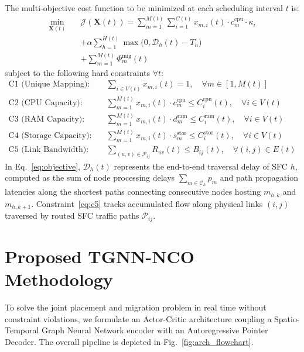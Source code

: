 \documentclass[conference]{IEEEtran}
\begin{document}
The multi-objective cost function to be minimized at each scheduling interval $t$ is:
\begin{align}
\min_{\mathbf{X}(t)} \quad & \mathcal{J}(\mathbf{X}(t)) = \sum_{m=1}^{M(t)} \sum_{i=1}^{C(t)} x_{m, i}(t) \cdot c_m^{\text{cpu}} \cdot \kappa_i \nonumber \\
& + \alpha \sum_{h=1}^{H(t)} \max\big(0, \mathcal{D}_h(t) - T_h\big) \nonumber \\
& + \sum_{m=1}^{M(t)} \Phi_m^{\text{mig}}(t)
\label{eq:objective}
\end{align}
subject to the following hard constraints $\forall t$:
\begin{align}
\text{C1 (Unique Mapping):} \quad & \sum_{i \in V(t)} x_{m, i}(t) = 1, \quad \forall m \in [1, M(t)] \label{eq:c1} \\
\text{C2 (CPU Capacity):} \quad & \sum_{m=1}^{M(t)} x_{m, i}(t) \cdot c_m^{\text{cpu}} \le C_i^{\text{cpu}}(t), \quad \forall i \in V(t) \label{eq:c2} \\
\text{C3 (RAM Capacity):} \quad & \sum_{m=1}^{M(t)} x_{m, i}(t) \cdot d_m^{\text{ram}} \le C_i^{\text{ram}}(t), \quad \forall i \in V(t) \label{eq:c3} \\
\text{C4 (Storage Capacity):} \quad & \sum_{m=1}^{M(t)} x_{m, i}(t) \cdot s_m^{\text{stor}} \le C_i^{\text{stor}}(t), \quad \forall i \in V(t) \label{eq:c4} \\
\text{C5 (Link Bandwidth):} \quad & \sum_{(u, v) \in \mathcal{P}_{ij}} R_{uv}(t) \le B_{ij}(t), \quad \forall (i, j) \in E(t) \label{eq:c5}
\end{align}
In Eq.~\eqref{eq:objective}, $\mathcal{D}_h(t)$ represents the end-to-end traversal delay of SFC $h$, computed as the sum of node processing delays $\sum_{m \in \mathcal{C}_h} p_m$ and path propagation latencies along the shortest paths connecting consecutive nodes hosting $m_{h, k}$ and $m_{h, k+1}$. Constraint~\eqref{eq:c5} tracks accumulated flow along physical links $(i, j)$ traversed by routed SFC traffic paths $\mathcal{P}_{ij}$.

\section{Proposed TGNN-NCO Methodology}
\label{sec:method}

To solve the joint placement and migration problem in real time without constraint violations, we formulate an Actor-Critic architecture coupling a Spatio-Temporal Graph Neural Network encoder with an Autoregressive Pointer Decoder. The overall pipeline is depicted in Fig.~\ref{fig:arch_flowchart}.
\end{document}

